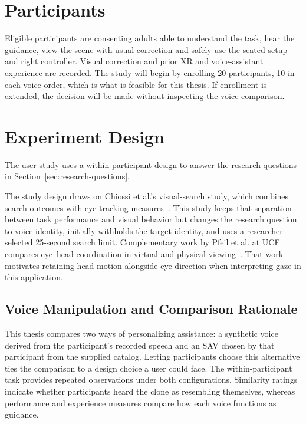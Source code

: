 \section{Participants}
\label{sec:participants}
Eligible participants are consenting adults able to understand the task, hear the guidance, view the scene with usual correction and safely use the seated setup and right controller. Visual correction and prior XR and voice-assistant experience are recorded. The study will begin by enrolling 20 participants, 10 in each voice order, which is what is feasible for this thesis. If enrollment is extended, the decision will be made without inspecting the voice comparison.

\section{Experiment Design}
\label{ch:methodology}
The user study uses a within-participant design to answer the research questions in Section~\ref{sec:research-questions}.

The study design draws on Chiossi et al.'s visual-search study, which combines search outcomes with eye-tracking measures~\cite{chiossi2024searching}. This study keeps that separation between task performance and visual behavior but changes the research question to voice identity, initially withholds the target identity, and uses a researcher-selected 25-second search limit. Complementary work by Pfeil et al. at UCF compares eye--head coordination in virtual and physical viewing~\cite{pfeil2018eyehead}. That work motivates retaining head motion alongside eye direction when interpreting gaze in this application.

\subsection{Voice Manipulation and Comparison Rationale}
This thesis compares two ways of personalizing assistance: a synthetic voice derived from the participant's recorded speech and an SAV chosen by that participant from the supplied catalog. Letting participants choose this alternative ties the comparison to a design choice a user could face. The within-participant task provides repeated observations under both configurations. Similarity ratings indicate whether participants heard the clone as resembling themselves, whereas performance and experience measures compare how each voice functions as guidance.

